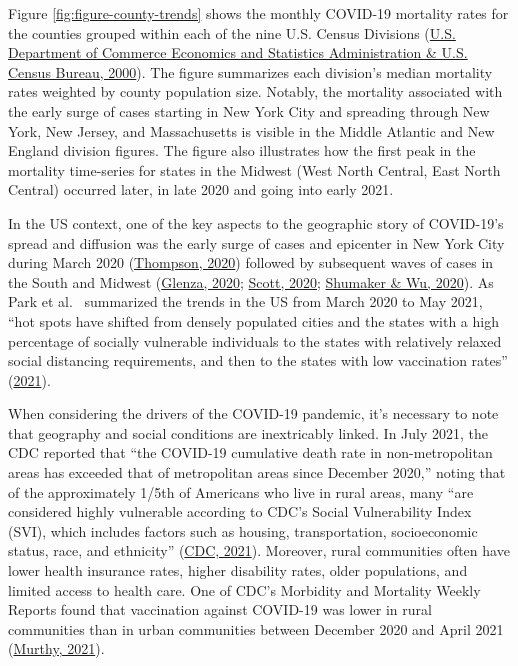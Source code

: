 \documentclass[
]{article}
\begin{document}
Figure \ref{fig:figure-county-trends} shows the monthly COVID-19 mortality
rates for the counties grouped within each of the nine U.S. Census Divisions
(\protect\hyperlink{ref-us_department_of_commerce_economics_and_statistics_administration_census_2000}{U.S. Department of Commerce Economics and Statistics Administration \& U.S. Census Bureau, 2000}).
The figure summarizes each division's median mortality rates
weighted by county population size.
Notably, the mortality associated
with the early surge of cases starting in New York City and spreading through New York,
New Jersey, and Massachusetts is visible in the Middle Atlantic and New England
division figures. The figure also illustrates how the first peak in the
mortality time-series for states in the Midwest (West North Central, East North
Central) occurred later, in late 2020 and going into early 2021.

In the US context, one of the key aspects to the geographic story of COVID-19's
spread and diffusion was the early surge of cases and epicenter in New York City
during March 2020 (\protect\hyperlink{ref-thompson_covid-19_2020}{Thompson, 2020}) followed by subsequent waves of cases in the
South and Midwest (\protect\hyperlink{ref-glenza_covid_2020}{Glenza, 2020}; \protect\hyperlink{ref-scott_these_2020}{Scott, 2020}; \protect\hyperlink{ref-shumaker_covid-19_2020}{Shumaker \& Wu, 2020}). As Park et al.~
summarized the trends in the US from March 2020 to May 2021, ``hot spots have shifted from densely populated cities and the states with a high percentage of socially vulnerable individuals to the states with relatively relaxed social distancing requirements, and then to the states with low vaccination rates'' (\protect\hyperlink{ref-park_covid-19_2021}{2021}).

When considering the drivers of the COVID-19 pandemic, it's necessary to note that
geography and social conditions are inextricably linked. In July 2021, the CDC
reported that ``the COVID-19 cumulative death rate in non-metropolitan areas has
exceeded that of metropolitan areas since December 2020,'' noting that of the
approximately 1/5th of Americans who live in rural areas, many ``are considered
highly vulnerable according to CDC's Social Vulnerability Index (SVI), which
includes factors such as housing, transportation, socioeconomic status, race,
and ethnicity'' (\protect\hyperlink{ref-cdc_location_2021}{CDC, 2021}). Moreover, rural communities often have
lower health insurance rates, higher disability rates, older populations, and
limited access to health care. One of CDC's Morbidity and Mortality Weekly
Reports found that vaccination against COVID-19 was lower in rural communities
than in urban communities between December 2020 and April 2021
(\protect\hyperlink{ref-murthy_disparities_2021}{Murthy, 2021}).
\end{document}
